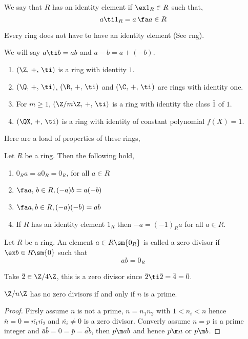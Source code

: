 We say that $R$ has an identity element if $\ex 1_R \in R$ such that,
$$ a\ti 1_R = a\, \fa a \in R $$

\begin{remark}
   Every ring does not have to have an identity element (See rng).
\end{remark}

\begin{notation}
   We will say $a \ti b = ab$ and $a - b = a + (-b)$.
\end{notation}

\begin{eg}
  \begin{enumerate}
    \item $(\Z,\,+,\,\ti)$ is a ring with identity $1$.
    \item $(\Q,\,+,\,\ti)$, $(\R,\,+,\,\ti)$ and $(\C,\,+,\,\ti)$ are rings with identity one.
    \item For $m \ge 1$, $(\Z/m\Z,\,+,\,\ti)$ is a ring with identity the class $\bar{1}$ of $1$.
    \item $(\QX,\,+,\,\ti)$ is a ring with identity of constant polynomial $f(X) = 1$.
  \end{enumerate}
\end{eg}

Here are a load of properties of these rings,
\begin{nlemma}
  Let $R$ be a ring. Then the following hold,
  \begin{enumerate}
    \item $0_Ra = a0_R = 0_R$, for all $a \in R$
    \item $\fa a,\,b \in R, (-a)b = a(-b)$
    \item $\fa a, b \in R, (-a)(-b) = ab$
    \item If $R$ has an identity element $1_R$ then $-a = (-1)_R a$ for all $a\in R$.
  \end{enumerate}
\end{nlemma}

\begin{ndefi}
  Let $R$ be a ring. An element $a \in R \sm \{0_R\}$ is called a zero divisor if $\ex b \in R \sm \{0\}$ such that
  $$ ab = 0_R $$
\end{ndefi}

\begin{eg}
  Take $\bar 2 \in \Z/4\Z$, this is a zero divisor since $\bar 2 \ti \bar 2 = \bar 4 = \bar 0$.
\end{eg}

\begin{nprop}
  $\Z/n\Z$ has no zero divisors if and only if $n$ is a prime.
\end{nprop}
\begin{proof}
  Firsly assume $n$ is not a prime, $n = n_1n_2$ with $1 < n_i < n$ hence $\bar n = 0 = \bar{n_1}\bar{n_2}$ and $\bar{n_i} \ne 0$ is a zero divisor. Converly assume $n =p$ is a prime integer and $\bar{a}\bar{b} = 0 = \bar{p} = \bar{ab}$, then $p \m ab$ and hence $p \m a$ or $p \m b$.
\end{proof}

